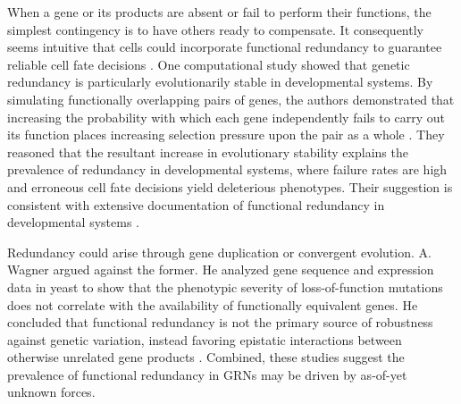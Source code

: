 When a gene or its products are absent or fail to perform their functions, the simplest contingency is to have others ready to compensate. It consequently seems intuitive that cells could incorporate functional redundancy to guarantee reliable cell fate decisions \cite{Hartman2001,McAdams1999}. One computational study showed that genetic redundancy is particularly evolutionarily stable in developmental systems. By simulating functionally overlapping pairs of genes, the authors demonstrated that increasing the probability with which each gene independently fails to carry out its function places increasing selection pressure upon the pair as a whole \cite{Nowak1997}. They reasoned that the resultant increase in evolutionary stability explains the prevalence of redundancy in developmental systems, where failure rates are high and erroneous cell fate decisions yield deleterious phenotypes. Their suggestion is consistent with extensive documentation of functional redundancy in developmental systems \cite{Kitano2004}. 

Redundancy could arise through gene duplication or convergent evolution. A. Wagner argued against the former. He analyzed gene sequence and expression data in yeast to show that the phenotypic severity of loss-of-function mutations does not correlate with the availability of functionally equivalent genes. He concluded that functional redundancy is not the primary source of robustness against genetic variation, instead favoring epistatic interactions between otherwise unrelated gene products \cite{Wagner2000}. Combined, these studies suggest the prevalence of functional redundancy in GRNs may be driven by as-of-yet unknown forces.
